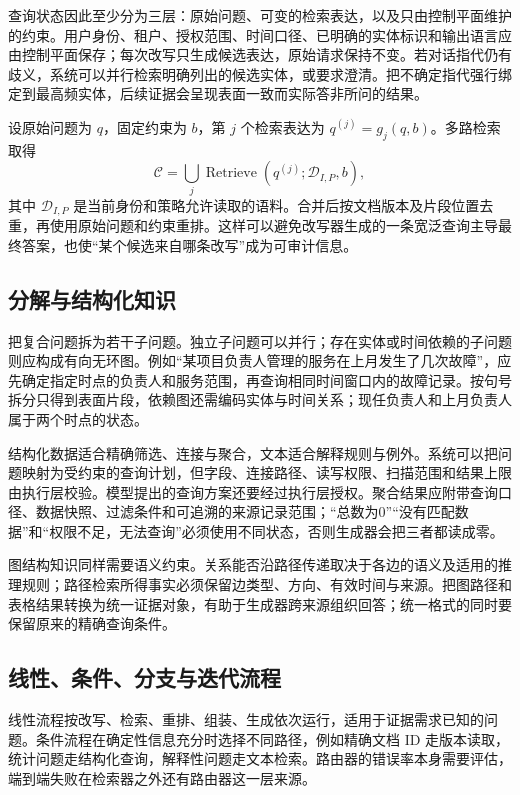 \documentclass[../textbook.tex]{subfiles}
\begin{document}
查询状态因此至少分为三层：原始问题、可变的检索表达，以及只由控制平面维护的约束。用户身份、租户、授权范围、时间口径、已明确的实体标识和输出语言应由控制平面保存；每次改写只生成候选表达，原始请求保持不变。若对话指代仍有歧义，系统可以并行检索明确列出的候选实体，或要求澄清。把不确定指代强行绑定到最高频实体，后续证据会呈现表面一致而实际答非所问的结果。

设原始问题为 $q$，固定约束为 $b$，第 $j$ 个检索表达为 $q^{(j)}=g_j(q,b)$。多路检索取得
\begin{equation}
 \mathcal C=\bigcup_j\operatorname{Retrieve}(q^{(j)};\mathcal D_{I,P},b),
\end{equation}
其中 $\mathcal D_{I,P}$ 是当前身份和策略允许读取的语料。合并后按文档版本及片段位置去重，再使用原始问题和约束重排。这样可以避免改写器生成的一条宽泛查询主导最终答案，也使“某个候选来自哪条改写”成为可审计信息。

\subsection{分解与结构化知识}
把复合问题拆为若干子问题。独立子问题可以并行；存在实体或时间依赖的子问题则应构成有向无环图。例如“某项目负责人管理的服务在上月发生了几次故障”，应先确定指定时点的负责人和服务范围，再查询相同时间窗口内的故障记录。按句号拆分只得到表面片段，依赖图还需编码实体与时间关系；现任负责人和上月负责人属于两个时点的状态。

结构化数据适合精确筛选、连接与聚合，文本适合解释规则与例外。系统可以把问题映射为受约束的查询计划，但字段、连接路径、读写权限、扫描范围和结果上限由执行层校验。模型提出的查询方案还要经过执行层授权。聚合结果应附带查询口径、数据快照、过滤条件和可追溯的来源记录范围；“总数为0”“没有匹配数据”和“权限不足，无法查询”必须使用不同状态，否则生成器会把三者都读成零。

图结构知识同样需要语义约束。关系能否沿路径传递取决于各边的语义及适用的推理规则；路径检索所得事实必须保留边类型、方向、有效时间与来源。把图路径和表格结果转换为统一证据对象，有助于生成器跨来源组织回答；统一格式的同时要保留原来的精确查询条件。

\subsection{线性、条件、分支与迭代流程}
线性流程按改写、检索、重排、组装、生成依次运行，适用于证据需求已知的问题。条件流程在确定性信息充分时选择不同路径，例如精确文档 ID 走版本读取，统计问题走结构化查询，解释性问题走文本检索。路由器的错误率本身需要评估，端到端失败在检索器之外还有路由器这一层来源。
\end{document}
